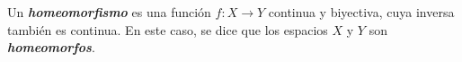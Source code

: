 

\begin{definition}
Un \emph{\textbf{homeomorfismo}} es una función $f : X \longrightarrow Y$ continua y biyectiva, cuya inversa también es continua. En este caso, se dice que los espacios $X$ y $Y$ son \emph{\textbf{homeomorfos}}.
\end{definition}
